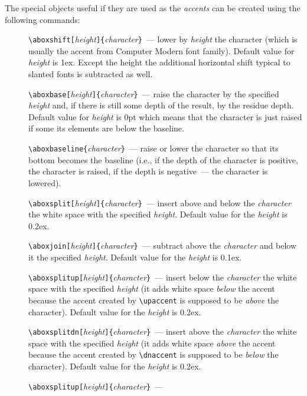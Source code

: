 The special objects useful if they are used
as the {\em accents} can be created using the following
commands:
\begin{description}
\item[] \verb?\aboxshift[?{\em height}\verb?]{?{\em character}\verb?}?~---
   lower by {\em height} the character
   (which is usually the accent from Computer Modern font family).
   Default value for {\em height} is  \textsf{1ex}.
   Except the height the additional horizontal shift
   typical to slanted fonts is subtracted as well.
\item[] \verb?\aboxbase[?{\em height}\verb?]{?{\em character}\verb?}?~---
   raise the character by the specified {\em height} and, if
   there is still some depth of the result, by the residue depth.
   Default value for {\em height} is  \textsf{0pt}
   which means that the character is just raised if some its
   elements are below the baseline.
\item[] \verb?\aboxbaseline{?{\em character}\verb?}?~---
   raise or lower the character so that its bottom becomes
   the baseline (i.e., if the depth of the character is positive,
   the character is raised, if the depth is negative~---
   the character is lowered).
\item[] \verb?\aboxsplit[?{\em height}\verb?]{?{\em character}\verb?}?~---
   insert above and below the {\em character} the
   white space with the specified {\em height}. Default value
   for the {\em height} is \textsf{0.2ex}.
\item[] \verb?\aboxjoin[?{\em height}\verb?]{?{\em character}\verb?}?~---
   subtract above the {\em character} and below it the
   specified {\em height}.  Default value
   for the {\em height} is \textsf{0.1ex}.
\item[] \verb?\aboxsplitup[?{\em height}\verb?]{?{\em character}\verb?}?~---
   insert below the {\em character} the
   white space with the specified {\em height} (it adds white space
   \textit{below} the accent because the accent created by \verb?\upaccent?
   is supposed to be \textit{above} the character). Default value
   for the {\em height} is \textsf{0.2ex}.
\item[] \verb?\aboxsplitdn[?{\em height}\verb?]{?{\em character}\verb?}?~---
   insert above the {\em character} the
   white space with the specified {\em height} (it adds white space
   \textit{above} the accent because the accent created by \verb?\dnaccent?
   is supposed to be \textit{below} the character). Default value
   for the {\em height} is \textsf{0.2ex}.
\item[] \verb?\aboxsplitup[?{\em height}\verb?]{?{\em character}\verb?}?~---

\end{description}
